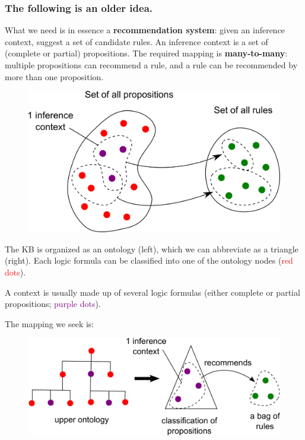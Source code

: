 \underconst

\subsubsection{The following is an older idea.}
\label{sec:hi-oracle}
What we need is in essence a \textbf{recommendation system}:  given an inference context, suggest a set of candidate rules.  An inference context is a set of (complete or partial) propositions.  The required mapping is \textbf{many-to-many}:  multiple propositions can recommend a rule, and a rule can be recommended by more than one proposition.
\begin{figure}[H]
\centering
\includegraphics[scale=1]{many-to-many-mapping.png}
\end{figure}

The KB is organized as an ontology (left), which we can abbreviate as a triangle (right).  Each logic formula can be classified into one of the ontology nodes (\textcolor{red}{red dots}).

A context is usually made up of several logic formulas (either complete or partial propositions;  \textcolor{Purple}{purple dots}).

The mapping we seek is:
\begin{figure}[H]
\centering
\includegraphics[scale=1]{ontology-triangular-form.png}
\end{figure}

